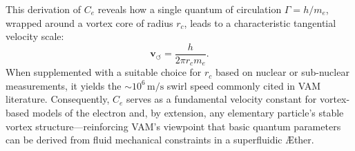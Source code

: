 This derivation of \(C_e\) reveals how a single quantum of circulation \(\Gamma = h/m_e\), wrapped around a vortex core of radius \(r_c\), leads to a characteristic tangential velocity scale:
\[
    \mathbf{v}_{\scriptscriptstyle\boldsymbol{\circlearrowleft}} = \frac{h}{2\pi r_c m_e}.
\]
When supplemented with a suitable choice for \(r_c\) based on nuclear or sub-nuclear measurements, it yields the \(\sim10^6\,\text{m/s}\) swirl speed commonly cited in VAM literature. Consequently, \(C_e\) serves as a fundamental velocity constant for vortex-based models of the electron and, by extension, any elementary particle's stable vortex structure—reinforcing VAM's viewpoint that basic quantum parameters can be derived from fluid mechanical constraints in a superfluidic Æther.